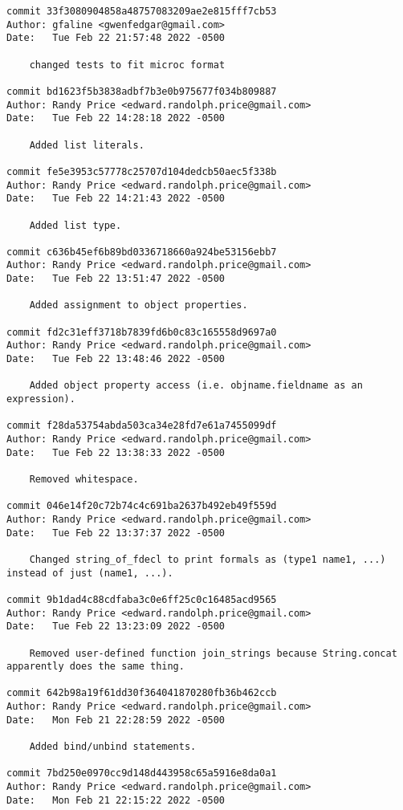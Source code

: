 {\begin{verbatim}
commit 33f3080904858a48757083209ae2e815fff7cb53
Author: gfaline <gwenfedgar@gmail.com>
Date:   Tue Feb 22 21:57:48 2022 -0500

    changed tests to fit microc format

commit bd1623f5b3838adbf7b3e0b975677f034b809887
Author: Randy Price <edward.randolph.price@gmail.com>
Date:   Tue Feb 22 14:28:18 2022 -0500

    Added list literals.

commit fe5e3953c57778c25707d104dedcb50aec5f338b
Author: Randy Price <edward.randolph.price@gmail.com>
Date:   Tue Feb 22 14:21:43 2022 -0500

    Added list type.

commit c636b45ef6b89bd0336718660a924be53156ebb7
Author: Randy Price <edward.randolph.price@gmail.com>
Date:   Tue Feb 22 13:51:47 2022 -0500

    Added assignment to object properties.

commit fd2c31eff3718b7839fd6b0c83c165558d9697a0
Author: Randy Price <edward.randolph.price@gmail.com>
Date:   Tue Feb 22 13:48:46 2022 -0500

    Added object property access (i.e. objname.fieldname as an expression).

commit f28da53754abda503ca34e28fd7e61a7455099df
Author: Randy Price <edward.randolph.price@gmail.com>
Date:   Tue Feb 22 13:38:33 2022 -0500

    Removed whitespace.

commit 046e14f20c72b74c4c691ba2637b492eb49f559d
Author: Randy Price <edward.randolph.price@gmail.com>
Date:   Tue Feb 22 13:37:37 2022 -0500

    Changed string_of_fdecl to print formals as (type1 name1, ...) instead of just (name1, ...).

commit 9b1dad4c88cdfaba3c0e6ff25c0c16485acd9565
Author: Randy Price <edward.randolph.price@gmail.com>
Date:   Tue Feb 22 13:23:09 2022 -0500

    Removed user-defined function join_strings because String.concat apparently does the same thing.

commit 642b98a19f61dd30f364041870280fb36b462ccb
Author: Randy Price <edward.randolph.price@gmail.com>
Date:   Mon Feb 21 22:28:59 2022 -0500

    Added bind/unbind statements.

commit 7bd250e0970cc9d148d443958c65a5916e8da0a1
Author: Randy Price <edward.randolph.price@gmail.com>
Date:   Mon Feb 21 22:15:22 2022 -0500


\end{verbatim}}
